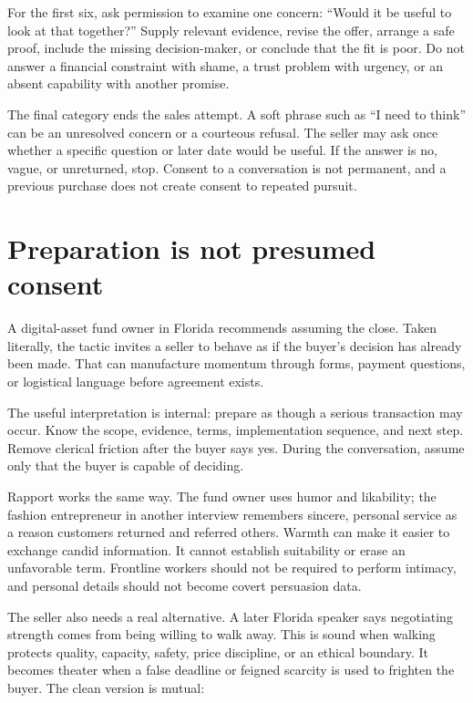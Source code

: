 For the first six, ask permission to examine one concern: ``Would it be useful
to look at that together?'' Supply relevant evidence, revise the offer, arrange
a safe proof, include the missing decision-maker, or conclude that the fit is
poor. Do not answer a financial constraint with shame, a trust problem with
urgency, or an absent capability with another promise.

The final category ends the sales attempt. A soft phrase such as ``I need to
think'' can be an unresolved concern or a courteous refusal. The seller may ask
once whether a specific question or later date would be useful. If the answer
is no, vague, or unreturned, stop. Consent to a conversation is not permanent,
and a previous purchase does not create consent to repeated pursuit.

\section{Preparation is not presumed consent}

A digital-asset fund owner in Florida recommends assuming the close. Taken
literally, the tactic invites a seller to behave as if the buyer's decision has
already been made. That can manufacture momentum through forms, payment
questions, or logistical language before agreement exists.

The useful interpretation is internal: prepare as though a serious transaction
may occur. Know the scope, evidence, terms, implementation sequence, and next
step. Remove clerical friction after the buyer says yes. During the
conversation, assume only that the buyer is capable of deciding.

Rapport works the same way. The fund owner uses humor and likability; the
fashion entrepreneur in another interview remembers sincere, personal service
as a reason customers returned and referred others. Warmth can make it easier
to exchange candid information. It cannot establish suitability or erase an
unfavorable term. Frontline workers should not be required to perform intimacy,
and personal details should not become covert persuasion data.

The seller also needs a real alternative. A later Florida speaker says
negotiating strength comes from being willing to walk away. This is sound when
walking protects quality, capacity, safety, price discipline, or an ethical
boundary. It becomes theater when a false deadline or feigned scarcity is used
to frighten the buyer. The clean version is mutual:

